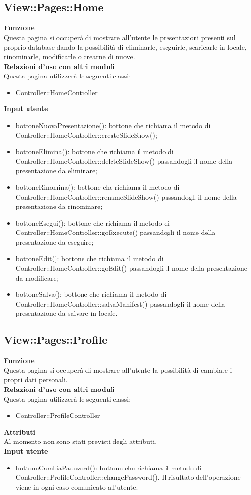 {\subsection{View::Pages::Home}{
	\textbf{Funzione}\\
	\indent Questa pagina si occuperà di mostrare all'utente le presentazioni presenti sul proprio database dando la possibilità di eliminarle, eseguirle, scaricarle in locale, rinominarle, modificarle o crearne di nuove.\\
	\textbf{Relazioni d'uso con altri moduli}\\
	\indent Questa pagina utilizzerà le seguenti classi:
	\begin{itemize}
		\item Controller::HomeController
	\end{itemize}
	\textbf{Input utente}
	\begin{itemize}
		\item bottoneNuovaPresentazione(): bottone che richiama il metodo di Controller::HomeController::createSlideShow();
		\item bottoneElimina(): bottone che richiama il metodo di Controller::HomeController::deleteSlideShow() passandogli il nome della presentazione da eliminare;
		\item bottoneRinomina(): bottone che richiama il metodo di Controller::HomeController::renameSlideShow() passandogli il nome della presentazione da rinominare;
		\item bottoneEsegui(): bottone che richiama il metodo di Controller::HomeController::goExecute() passandogli il nome della presentazione da eseguire;
		\item bottoneEdit(): bottone che richiama il metodo di Controller::HomeController::goEdit() passandogli il nome della presentazione da modificare;
		\item bottoneSalva(): bottone che richiama il metodo di Controller::HomeController::salvaManifest() passandogli il nome della presentazione da salvare in locale.
	\end{itemize}
	}
\subsection{View::Pages::Profile}{
	\textbf{Funzione}\\
	\indent Questa pagina si occuperà di mostrare all'utente la possibilità di cambiare i propri dati personali.\\
	\textbf{Relazioni d'uso con altri moduli}\\
	\indent Questa pagina utilizzerà le seguenti classi:
	\begin{itemize}
		\item Controller::ProfileController
	\end{itemize}
	\textbf{Attributi}\\
	\indent Al momento non sono stati previsti degli attributi.\\
	\textbf{Input utente}
	\begin{itemize}
		\item bottoneCambiaPassword(): bottone che richiama il metodo di Controller::ProfileController::changePassword(). Il risultato dell'operazione viene in ogni caso comunicato all'utente.
	\end{itemize}
}
}
